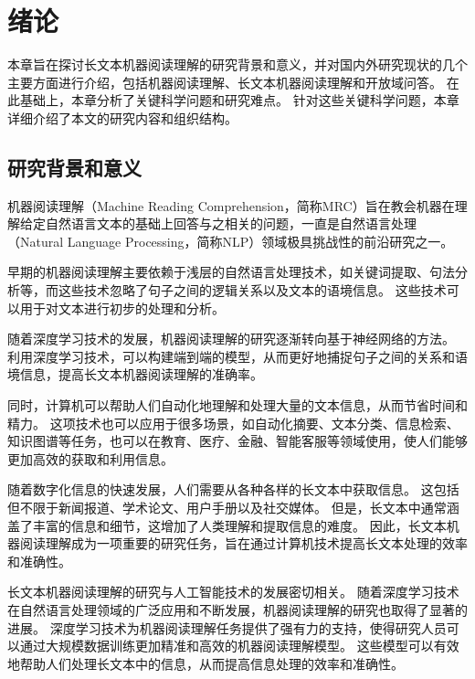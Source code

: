 \chapter{绪论}
本章旨在探讨长文本机器阅读理解的研究背景和意义，并对国内外研究现状的几个主要方面进行介绍，包括机器阅读理解、长文本机器阅读理解和开放域问答。
在此基础上，本章分析了关键科学问题和研究难点。
针对这些关键科学问题，本章详细介绍了本文的研究内容和组织结构。


\section{研究背景和意义}
机器阅读理解（Machine Reading Comprehension，简称MRC）旨在教会机器在理解给定自然语言文本的基础上回答与之相关的问题，一直是自然语言处理（Natural Language Processing，简称NLP）领域极具挑战性的前沿研究之一。

早期的机器阅读理解主要依赖于浅层的自然语言处理技术\cite{Liu2019NeuralMR,Zhang2020MachineRC,Cui2019ASD}，如关键词提取\cite{Li2021KeywordEM}、句法分析\cite{Yu2022SSAGNetSA}等，而这些技术忽略了句子之间的逻辑关系以及文本的语境信息。
这些技术可以用于对文本进行初步的处理和分析。

随着深度学习技术的发展，机器阅读理解的研究逐渐转向基于神经网络的方法\cite{hermann2015teaching}。
利用深度学习技术，可以构建端到端的模型，从而更好地捕捉句子之间的关系和语境信息，提高长文本机器阅读理解的准确率。

同时，计算机可以帮助人们自动化地理解和处理大量的文本信息，从而节省时间和精力。
这项技术也可以应用于很多场景，如自动化摘要\cite{Dong2018ASO}、文本分类\cite{Liu2016RecurrentNN}、信息检索\cite{Trabelsi2021NeuralRM}、知识图谱\cite{Lan2021KnowledgeGI}等任务，也可以在教育、医疗、金融、智能客服\cite{Ebersbach2016ArtificialNN}等领域使用，使人们能够更加高效的获取和利用信息。

随着数字化信息的快速发展，人们需要从各种各样的长文本中获取信息。
这包括但不限于新闻报道、学术论文、用户手册以及社交媒体。
但是，长文本中通常涵盖了丰富的信息和细节，这增加了人类理解和提取信息的难度。
因此，长文本机器阅读理解成为一项重要的研究任务，旨在通过计算机技术提高长文本处理的效率和准确性。

长文本机器阅读理解的研究与人工智能技术的发展密切相关。
随着深度学习技术在自然语言处理领域的广泛应用和不断发展，机器阅读理解的研究也取得了显著的进展。
深度学习技术为机器阅读理解任务提供了强有力的支持，使得研究人员可以通过大规模数据训练更加精准和高效的机器阅读理解模型。
这些模型可以有效地帮助人们处理长文本中的信息，从而提高信息处理的效率和准确性。


